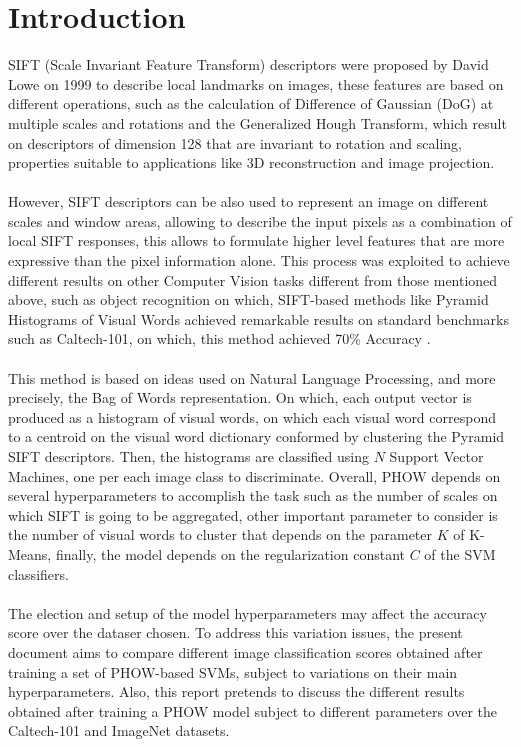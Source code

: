 \documentclass[10pt,twocolumn,letterpaper]{article}
\begin{document}
\section{Introduction}
SIFT (Scale Invariant Feature Transform) descriptors were proposed by David Lowe \cite{Lowe:1999:ORL:850924.851523} on 1999 to describe local landmarks on images, these features are based on different operations, such as the calculation of Difference of Gaussian (DoG) at multiple scales and rotations and the Generalized Hough Transform, which result on descriptors of dimension 128 that are invariant to rotation and scaling, properties suitable to applications like 3D reconstruction and image projection. 
\\
\\
However, SIFT descriptors can be also used to represent an image on different scales and window areas, allowing to describe the input pixels as a combination of local SIFT responses, this allows to formulate higher level features that are more expressive than the pixel information alone. This process was exploited to achieve different results on other Computer Vision tasks different from those mentioned above, such as object recognition on which, SIFT-based methods like Pyramid Histograms of Visual Words achieved remarkable results on standard benchmarks such as Caltech-101, on which, this method achieved 70\% Accuracy \cite{Lazebnik:2006:BBF:1153171.1153549}.
\\
\\
This method is based on ideas used on Natural Language Processing, and more precisely, the Bag of Words representation. On which, each output vector is produced as a histogram of visual words, on which each visual word correspond to a centroid on the visual word dictionary conformed by clustering the Pyramid SIFT descriptors. Then, the histograms are classified using $N$ Support Vector Machines, one per each image class to discriminate. Overall, PHOW depends on several hyperparameters to accomplish the task such as the number of scales on which SIFT is going to be aggregated, other important parameter to consider is the number of visual words to cluster that depends on the parameter $K$ of K-Means, finally, the model depends on the regularization constant $C$ of the SVM classifiers.  
\\
\\
The election and setup of the model hyperparameters may affect the accuracy score over the dataser chosen. To address this variation issues, the present document aims to compare different image classification scores obtained after training a set of PHOW-based SVMs, subject to variations on their main hyperparameters.  Also, this report pretends to discuss the different results obtained after training a PHOW model subject to different parameters over the Caltech-101 and ImageNet datasets. 
\end{document}

